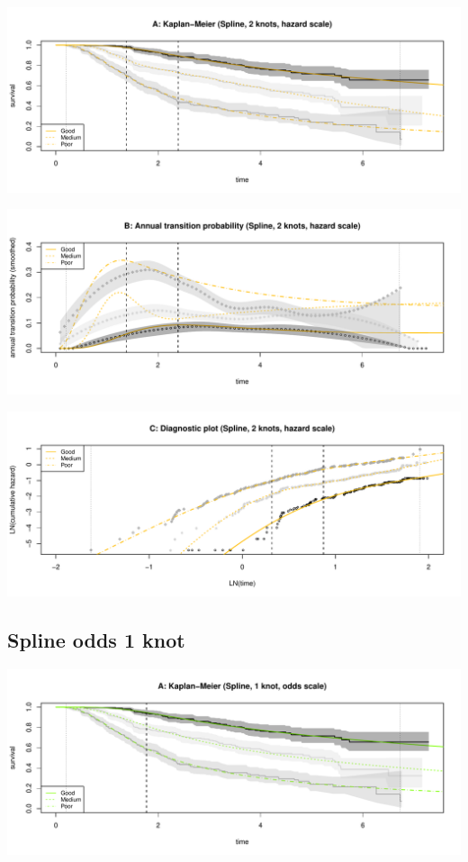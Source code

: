 \documentclass[]{article}
\begin{document}
\begin{flushleft}\includegraphics[height=0.3\textheight]{images/spline_hazard2-1} \end{flushleft}

\begin{flushleft}\includegraphics[height=0.3\textheight]{images/spline_hazard2-2} \end{flushleft}

\begin{flushleft}\includegraphics[height=0.3\textheight]{images/spline_hazard2-3} \end{flushleft}

\subsection{Spline odds 1 knot}\label{spline-odds-1-knot}

\begin{flushleft}\includegraphics[height=0.3\textheight]{images/spline_odds1-1} \end{flushleft}
\end{document}
